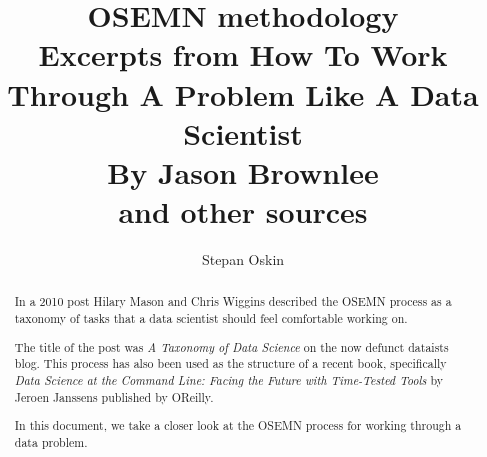 \documentclass[11pt]{article}
\begin{document}
    \title{OSEMN methodology\\
    Excerpts from How To Work Through A Problem Like A Data Scientist \\
    By Jason Brownlee\cite{Brownlee2014} \\
    and other sources}


    \author{Stepan Oskin}

    \maketitle

    \begin{abstract}

    In a 2010 post Hilary Mason and Chris Wiggins described the OSEMN process as a taxonomy of tasks that a data scientist should feel comfortable working on.

    The title of the post was \textit{A Taxonomy of Data Science} on the now defunct dataists blog\cite{Mason2010}.
    This process has also been used as the structure of a recent book, specifically \textit{Data Science at the Command Line: Facing the Future with Time-Tested Tools} by Jeroen Janssens published by O\’Reilly\cite{Janssens}.

    In this document, we take a closer look at the OSEMN process for working through a data problem.
    \end{abstract}



    
    
\end{document}
